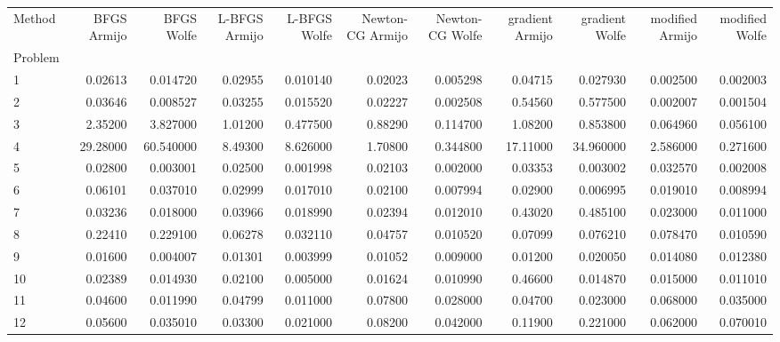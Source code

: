 \begin{tabular}{lrrrrrrrrrr}
\toprule
Method &  BFGS Armijo &  BFGS Wolfe &  L-BFGS Armijo &  L-BFGS Wolfe &  Newton-CG Armijo &  Newton-CG Wolfe &  gradient Armijo &  gradient Wolfe &  modified Armijo &  modified Wolfe \\
Problem &              &             &                &               &                   &                  &                  &                 &                  &                 \\
\midrule
1       &      0.02613 &    0.014720 &        0.02955 &      0.010140 &           0.02023 &         0.005298 &          0.04715 &        0.027930 &         0.002500 &        0.002003 \\
2       &      0.03646 &    0.008527 &        0.03255 &      0.015520 &           0.02227 &         0.002508 &          0.54560 &        0.577500 &         0.002007 &        0.001504 \\
3       &      2.35200 &    3.827000 &        1.01200 &      0.477500 &           0.88290 &         0.114700 &          1.08200 &        0.853800 &         0.064960 &        0.056100 \\
4       &     29.28000 &   60.540000 &        8.49300 &      8.626000 &           1.70800 &         0.344800 &         17.11000 &       34.960000 &         2.586000 &        0.271600 \\
5       &      0.02800 &    0.003001 &        0.02500 &      0.001998 &           0.02103 &         0.002000 &          0.03353 &        0.003002 &         0.032570 &        0.002008 \\
6       &      0.06101 &    0.037010 &        0.02999 &      0.017010 &           0.02100 &         0.007994 &          0.02900 &        0.006995 &         0.019010 &        0.008994 \\
7       &      0.03236 &    0.018000 &        0.03966 &      0.018990 &           0.02394 &         0.012010 &          0.43020 &        0.485100 &         0.023000 &        0.011000 \\
8       &      0.22410 &    0.229100 &        0.06278 &      0.032110 &           0.04757 &         0.010520 &          0.07099 &        0.076210 &         0.078470 &        0.010590 \\
9       &      0.01600 &    0.004007 &        0.01301 &      0.003999 &           0.01052 &         0.009000 &          0.01200 &        0.020050 &         0.014080 &        0.012380 \\
10      &      0.02389 &    0.014930 &        0.02100 &      0.005000 &           0.01624 &         0.010990 &          0.46600 &        0.014870 &         0.015000 &        0.011010 \\
11      &      0.04600 &    0.011990 &        0.04799 &      0.011000 &           0.07800 &         0.028000 &          0.04700 &        0.023000 &         0.068000 &        0.035000 \\
12      &      0.05600 &    0.035010 &        0.03300 &      0.021000 &           0.08200 &         0.042000 &          0.11900 &        0.221000 &         0.062000 &        0.070010 \\
\bottomrule
\end{tabular}
